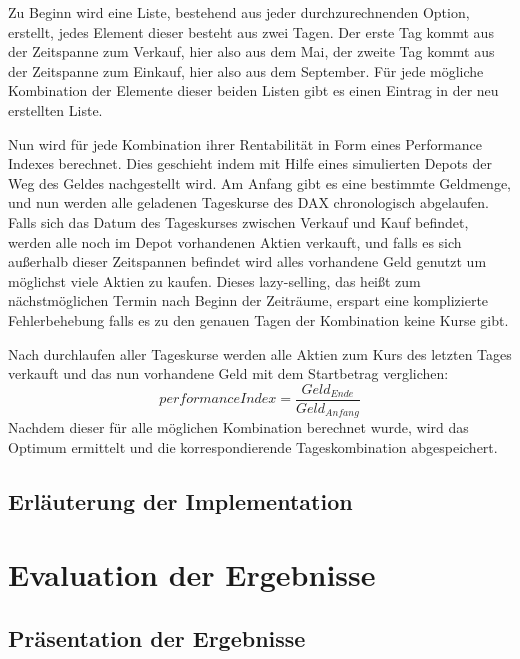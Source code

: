 \documentclass[12pt, a4paper, titlepage]{report}
\begin{document}
            Zu Beginn wird eine Liste, bestehend aus jeder durchzurechnenden Option,
            erstellt, jedes Element dieser besteht aus zwei Tagen. Der erste Tag 
            kommt aus der Zeitspanne zum Verkauf, hier also aus dem Mai, der zweite
            Tag kommt aus der Zeitspanne zum Einkauf, hier also aus dem September.
            Für jede mögliche Kombination der Elemente dieser beiden Listen gibt es
            einen Eintrag in der neu erstellten Liste.

            Nun wird für jede Kombination ihrer Rentabilität in Form eines
            Performance Indexes berechnet. Dies geschieht indem mit Hilfe eines
            simulierten Depots der Weg des Geldes nachgestellt wird.
            Am Anfang gibt es eine bestimmte Geldmenge, und nun werden alle
            geladenen Tageskurse des DAX chronologisch abgelaufen.
            Falls sich das Datum des Tageskurses zwischen Verkauf
            und Kauf befindet, werden alle noch im Depot vorhandenen Aktien
            verkauft, und falls es sich außerhalb dieser Zeitspannen befindet
            wird alles vorhandene Geld genutzt um möglichst viele Aktien zu
            kaufen. Dieses lazy-selling, das heißt zum nächstmöglichen Termin nach
            Beginn der Zeiträume, erspart eine komplizierte Fehlerbehebung falls
            es zu den genauen Tagen der Kombination keine Kurse gibt.

            Nach durchlaufen aller Tageskurse werden alle Aktien zum Kurs des
            letzten Tages verkauft und das nun vorhandene Geld mit dem
            Startbetrag verglichen:
            \begin{equation}
                performanceIndex = \frac{Geld_{Ende}}{Geld_{Anfang}}
            \end{equation}
            Nachdem dieser für alle möglichen Kombination berechnet wurde, wird
            das Optimum ermittelt und die korrespondierende Tageskombination
            abgespeichert.

        \section{Erläuterung der Implementation}

    \chapter{Evaluation der Ergebnisse}

        \section{Präsentation der Ergebnisse}
\end{document}
